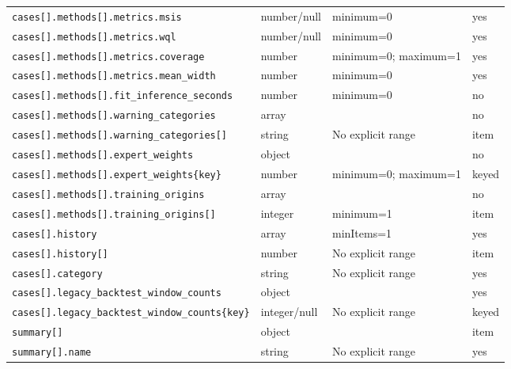 \begin{longtable}{@{}p{}p{}p{}p{}@{}}
\texttt{cases[].\allowbreak{}methods[].\allowbreak{}metrics.\allowbreak{}msis} & number/null & minimum=0 & yes\\
\texttt{cases[].\allowbreak{}methods[].\allowbreak{}metrics.\allowbreak{}wql} & number/null & minimum=0 & yes\\
\texttt{cases[].\allowbreak{}methods[].\allowbreak{}metrics.\allowbreak{}coverage} & number & minimum=0; maximum=1 & yes\\
\texttt{cases[].\allowbreak{}methods[].\allowbreak{}metrics.\allowbreak{}mean\_\allowbreak{}width} & number & minimum=0 & yes\\
\texttt{cases[].\allowbreak{}methods[].\allowbreak{}fit\_\allowbreak{}inference\_\allowbreak{}seconds} & number & minimum=0 & no\\
\texttt{cases[].\allowbreak{}methods[].\allowbreak{}warning\_\allowbreak{}categories} & array &  & no\\
\texttt{cases[].\allowbreak{}methods[].\allowbreak{}warning\_\allowbreak{}categories[]} & string & No explicit range & item\\
\texttt{cases[].\allowbreak{}methods[].\allowbreak{}expert\_\allowbreak{}weights} & object &  & no\\
\texttt{cases[].\allowbreak{}methods[].\allowbreak{}expert\_\allowbreak{}weights\{key\}} & number & minimum=0; maximum=1 & keyed\\
\texttt{cases[].\allowbreak{}methods[].\allowbreak{}training\_\allowbreak{}origins} & array &  & no\\
\texttt{cases[].\allowbreak{}methods[].\allowbreak{}training\_\allowbreak{}origins[]} & integer & minimum=1 & item\\
\texttt{cases[].\allowbreak{}history} & array & minItems=1 & yes\\
\texttt{cases[].\allowbreak{}history[]} & number & No explicit range & item\\
\texttt{cases[].\allowbreak{}category} & string & No explicit range & yes\\
\texttt{cases[].\allowbreak{}legacy\_\allowbreak{}backtest\_\allowbreak{}window\_\allowbreak{}counts} & object &  & yes\\
\texttt{cases[].\allowbreak{}legacy\_\allowbreak{}backtest\_\allowbreak{}window\_\allowbreak{}counts\{key\}} & integer/null & No explicit range & keyed\\
\texttt{summary[]} & object &  & item\\
\texttt{summary[].\allowbreak{}name} & string & No explicit range & yes\\

\end{longtable}
